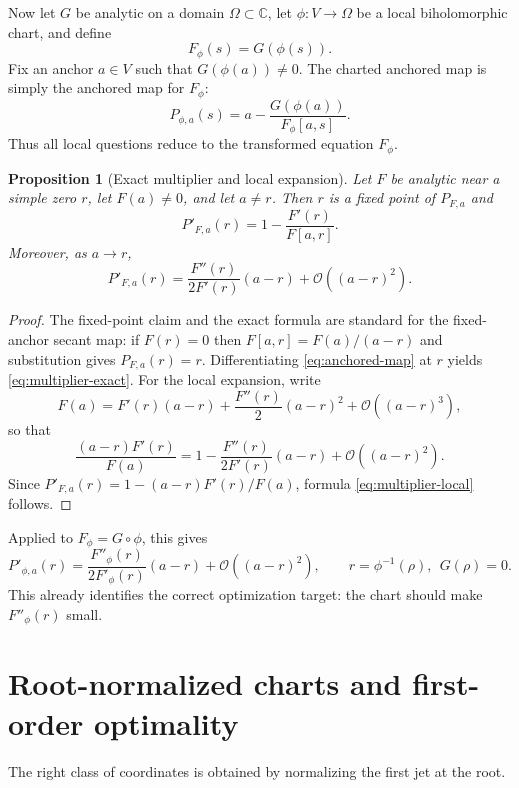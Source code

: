 \documentclass[11pt]{article}
\newtheorem{proposition}[theorem]{Proposition}
\theoremstyle{definition}
\newcommand{\C}{\mathbb{C}}
\newcommand{\Oterm}{\mathcal{O}}
\begin{document}
Now let $G$ be analytic on a domain $\Omega\subset\C$, let $\phi:V\to\Omega$ be a local biholomorphic chart, and define
\[
F_{\phi}(s)=G(\phi(s)).
\]
Fix an anchor $a\in V$ such that $G(\phi(a))\neq 0$. The charted anchored map is simply the anchored map for $F_{\phi}$:
\begin{equation}\label{eq:charted-map}
P_{\phi,a}(s)=a-\frac{G(\phi(a))}{F_{\phi}[a,s]}.
\end{equation}
Thus all local questions reduce to the transformed equation $F_{\phi}$.

\begin{proposition}[Exact multiplier and local expansion]\label{prop:exactmultiplier}
Let $F$ be analytic near a simple zero $r$, let $F(a)\neq 0$, and let $a\neq r$. Then $r$ is a fixed point of $P_{F,a}$ and
\begin{equation}\label{eq:multiplier-exact}
P'_{F,a}(r)=1-\frac{F'(r)}{F[a,r]}.
\end{equation}
Moreover, as $a\to r$,
\begin{equation}\label{eq:multiplier-local}
P'_{F,a}(r)=\frac{F''(r)}{2F'(r)}(a-r)+\Oterm((a-r)^2).
\end{equation}
\end{proposition}

\begin{proof}
The fixed-point claim and the exact formula are standard for the fixed-anchor secant map: if $F(r)=0$ then $F[a,r]=F(a)/(a-r)$ and substitution gives $P_{F,a}(r)=r$. Differentiating \eqref{eq:anchored-map} at $r$ yields \eqref{eq:multiplier-exact}. For the local expansion, write
\[
F(a)=F'(r)(a-r)+\frac{F''(r)}{2}(a-r)^2+\Oterm((a-r)^3),
\]
so that
\[
\frac{(a-r)F'(r)}{F(a)}=1-\frac{F''(r)}{2F'(r)}(a-r)+\Oterm((a-r)^2).
\]
Since $P'_{F,a}(r)=1-(a-r)F'(r)/F(a)$, formula \eqref{eq:multiplier-local} follows.
\end{proof}

Applied to $F_{\phi}=G\circ\phi$, this gives
\begin{equation}\label{eq:chart-multiplier}
P'_{\phi,a}(r)=\frac{F''_{\phi}(r)}{2F'_{\phi}(r)}(a-r)+\Oterm((a-r)^2),
\qquad r=\phi^{-1}(\rho),\ \ G(\rho)=0.
\end{equation}
This already identifies the correct optimization target: the chart should make $F''_{\phi}(r)$ small.

\section{Root-normalized charts and first-order optimality}
The right class of coordinates is obtained by normalizing the first jet at the root.
\end{document}
